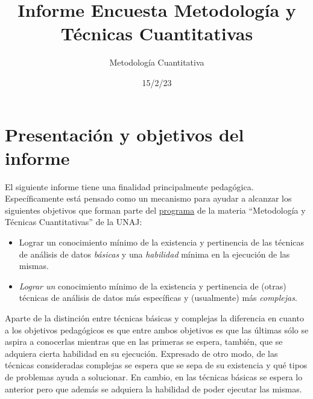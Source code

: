 \documentclass[
  letterpaper,
  DIV=11,
  numbers=noendperiod]{scrreprt}
\title{Informe Encuesta Metodología y Técnicas Cuantitativas}
\author{Metodología Cuantitativa}
\date{15/2/23}
\renewcommand*\contentsname{Tabla de contenidos}
\newcommand\contentsname{Tabla de contenidos}
\begin{document}
\maketitle
\ifdefined\Shaded\renewenvironment{Shaded}{\begin{tcolorbox}[frame hidden, enhanced, sharp corners, interior hidden, breakable, boxrule=0pt, borderline west={3pt}{0pt}{shadecolor}]}{\end{tcolorbox}}\fi

\renewcommand*\contentsname{Tabla de contenidos}
{
\hypersetup{linkcolor=}
\setcounter{tocdepth}{2}
\tableofcontents
}

\hypertarget{presentaciuxf3n-y-objetivos-del-informe}{%
\chapter*{Presentación y objetivos del
informe}\label{presentaciuxf3n-y-objetivos-del-informe}}


El siguiente informe tiene una finalidad principalmente pedagógica.
Específicamente está pensado como un mecanismo para ayudar a alcanzar
los siguientes objetivos que forman parte del
\href{https://docs.google.com/document/d/15ZuHJ1ZM7Z0g0Edt-mv1PCB697-x6-rZfcWdAtd85yM/edit\#heading=h.s43n504lcmmx}{programa}
de la materia ``Metodología y Técnicas Cuantitativas'' de la UNAJ:

\begin{itemize}
\item
  Lograr un conocimiento mínimo de la existencia y pertinencia de las
  técnicas de análisis de datos \emph{básicas} y una \emph{habilidad}
  mínima en la ejecución de las mismas.
\item
  \emph{Lograr un} conocimiento mínimo de la existencia y pertinencia de
  (otras) técnicas de análisis de datos más específicas y (usualmente)
  más \emph{complejas}.
\end{itemize}

Aparte de la distinción entre técnicas básicas y complejas la diferencia
en cuanto a los objetivos pedagógicos es que entre ambos objetivos es
que las últimas sólo se aspira a conocerlas mientras que en las primeras
se espera, también, que se adquiera cierta habilidad en su ejecución.
Expresado de otro modo, de las técnicas consideradas complejas se espera
que se sepa de su existencia y qué tipos de problemas ayuda a
solucionar. En cambio, en las técnicas básicas se espera lo anterior
pero que además se adquiera la habilidad de poder ejecutar las mismas.
\end{document}
